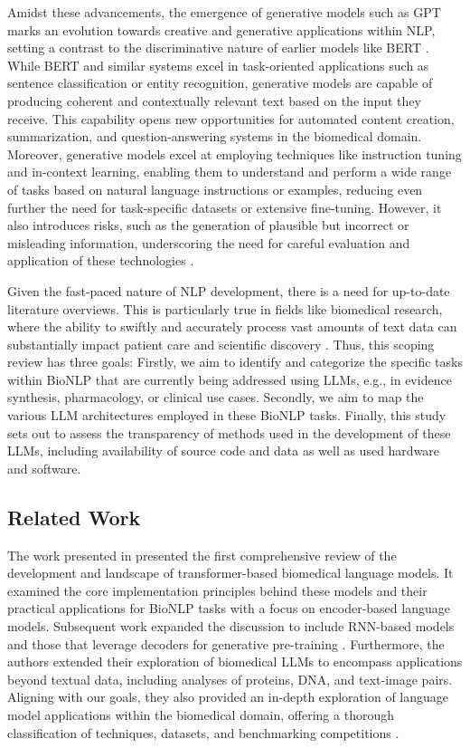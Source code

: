 \documentclass[fleqn,10pt]{olplainarticle}
\begin{document}
Amidst these advancements, the emergence of generative models such as GPT marks an evolution towards creative and generative applications within NLP, setting a contrast to the discriminative nature of earlier models like BERT \citep{radford2018improving,brown2020language}. While BERT and similar systems excel in task-oriented applications such as sentence classification or entity recognition, generative models are capable of producing coherent and contextually relevant text based on the input they receive. This capability opens new opportunities for automated content creation, summarization, and question-answering systems in the biomedical domain. Moreover, generative models excel at employing techniques like instruction tuning and in-context learning, enabling them to understand and perform a wide range of tasks based on natural language instructions or examples, reducing even further the need for task-specific datasets or extensive fine-tuning. However, it also introduces risks, such as the generation of plausible but incorrect or misleading information, underscoring the need for careful evaluation and application of these technologies \citep{thirunavukarasu2023large, ye2023cognitive}.

Given the fast-paced nature of NLP development, there is a need for up-to-date literature overviews. This is particularly true in fields like biomedical research, where the ability to swiftly and accurately process vast amounts of text data can substantially impact patient care and scientific discovery \citep{locke2021natural}. Thus, this scoping review has three goals: Firstly, we aim to identify and categorize the specific tasks within BioNLP that are currently being addressed using LLMs, e.g., in evidence synthesis,  pharmacology, or clinical use cases. Secondly, we aim to map the various LLM architectures employed in these BioNLP tasks. Finally, this study sets out to assess the transparency of methods used in the development of these LLMs, including availability of source code and data as well as used hardware and software.


\subsection*{Related Work}

The work presented in \citep{kalyan2022ammu} presented the first comprehensive review of the development and landscape of transformer-based biomedical language models. It examined the core implementation principles behind these models and their practical applications for BioNLP tasks with a focus on encoder-based language models. Subsequent work expanded the discussion to include RNN-based models and those that leverage decoders for generative pre-training \citep{wang2023pre}. Furthermore, the authors extended their exploration of biomedical LLMs to encompass applications beyond textual data, including analyses of proteins, DNA, and text-image pairs. Aligning with our goals, they also provided an in-depth exploration of language model applications within the biomedical domain, offering a thorough classification of techniques, datasets, and benchmarking competitions \citep{wang2023pre}.
\end{document}
